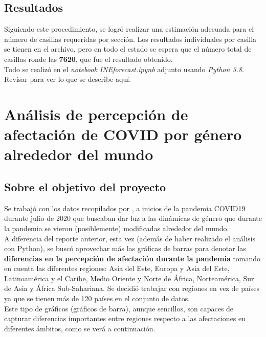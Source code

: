 \documentclass[12pt]{article}
\begin{document}
\subsection{Resultados}
Siguiendo este procedimiento, se logró realizar una estimación adecuada para el número de casillas requeridas por sección. Los resultados individuales por casilla se tienen en el archivo, pero en todo el estado se espera que el número total de casillas ronde las \textbf{7620}, que fue el resultado obtenido.\\
Todo se realizó en el \textit{notebook INEforecast.ipynb} adjunto usando \textit{Python 3.8}. Revisar para ver lo que se describe aquí.
\section{Análisis de percepción de afectación de COVID por género alrededor del mundo}
\subsection{Sobre el objetivo del proyecto}
Se trabajó con los datos recopilados por \cite{facebook}, a inicios de la pandemia COVID19 durante julio de 2020 que buscaban dar luz a las dinámicas de género que durante la pandemia se vieron (posiblemente) modificadas alrededor del mundo. \\
A diferencia del reporte anterior, esta vez (además de haber realizado el análisis con Python), se buscó aprovechar más las gráficas de barras para denotar las \textbf{diferencias en la percepción de afectación durante la pandemia} tomando en cuenta las diferentes regiones: Asia del Este, Europa y Asia del Este, Latinoamérica y el Caribe, Medio Oriente y Norte de África, Norteamérica, Sur de Asia y África Sub-Sahariana. Se decidió trabajar con regiones en vez de países ya que se tienen más de 120 países en el conjunto de datos.\\ Este tipo de gráficos (gráficos de barra), aunque sencillos, son capaces de capturar diferencias importantes entre regiones respecto a las afectaciones en diferentes ámbitos, como se verá a continuación.\\
\end{document}
